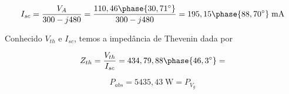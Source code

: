 \[ I_{sc} = \frac{V_A}{300 - j480} = \frac{110,46\phase{30,71^{\circ}}}{300 - j480} = 195,15\phase{88,70^{\circ}}\;\textrm{mA} \]

Conhecido $V_{th}$ e $I_{sc}$, temos a impedância de Thevenin dada por

\[ Z_{th} = \frac{V_{th}}{I_{sc}} = 434,79,88\phase{46,3^{\circ}} =  \]







\[ \boxed{P_{abs} = 5435,43 \;\textrm{W} = P_{V_g}} \]









